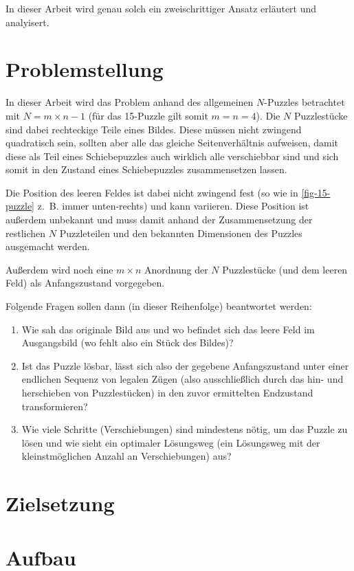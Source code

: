 \documentclass{whswinvcbook}
\begin{document}
In dieser Arbeit wird genau solch ein zweischrittiger Ansatz erläutert und analyisert.
\section{Problemstellung}
In dieser Arbeit wird das Problem anhand des allgemeinen $N$-Puzzles betrachtet mit $N=m\times n-1$ (für das 15-Puzzle gilt somit $m=n=4$).
Die $N$ Puzzlestücke sind dabei rechteckige Teile eines Bildes. Diese müssen nicht zwingend quadratisch sein, sollten aber alle das gleiche Seitenverhältnis aufweisen, damit diese als Teil eines Schiebepuzzles auch wirklich alle verschiebbar sind und sich somit in den Zustand eines Schiebepuzzles zusammensetzen lassen.

Die Position des leeren Feldes ist dabei nicht zwingend fest (so wie in \ref{fig-15-puzzle} z.~B. immer unten-rechts) und kann variieren. Diese Position ist außerdem unbekannt und muss damit anhand der Zusammensetzung der restlichen $N$ Puzzleteilen und den bekannten Dimensionen des Puzzles ausgemacht werden.

Außerdem wird noch eine $m\times n$ Anordnung der $N$ Puzzlestücke (und dem leeren Feld) als Anfangszustand vorgegeben.

Folgende Fragen sollen dann (in dieser Reihenfolge) beantwortet werden:
\begin{enumerate}
    \item Wie sah das originale Bild aus und wo befindet sich das leere Feld im Ausgangsbild (wo fehlt also ein Stück des Bildes)?
    \item Ist das Puzzle lösbar, lässt sich also der gegebene Anfangszustand unter einer endlichen Sequenz von legalen Zügen (also ausschließlich durch das hin- und herschieben von Puzzlestücken) in den zuvor ermittelten Endzustand transformieren?
    \item Wie viele Schritte (Verschiebungen) sind mindestens nötig, um das Puzzle zu lösen und wie sieht ein optimaler Lösungsweg (ein Lösungsweg mit der kleinstmöglichen Anzahl an Verschiebungen) aus?
\end{enumerate}
\section{Zielsetzung}
\section{Aufbau}
\end{document}
